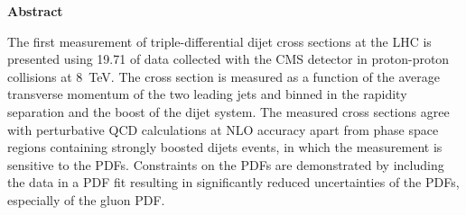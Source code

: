 \thispagestyle{plain}
\begin{center}
    \LARGE{\textbf{Abstract}}\\[2em]
\end{center}
    \normalsize
    The first measurement of triple-differential dijet cross sections at the LHC is presented
    using \SI{19.71}{\fbinv} of data collected with the CMS detector in
    proton-proton collisions at \SI{8}{\TeV}. The cross section is measured as a
    function of the average transverse momentum of the two leading jets and
    binned in the rapidity separation and the boost of the dijet system. The
    measured cross sections agree with perturbative QCD calculations at NLO
    accuracy apart from phase space regions containing strongly boosted dijets
    events, in which the measurement is sensitive to the PDFs. Constraints
    on the PDFs are demonstrated by including the data in a PDF fit resulting in
    significantly reduced uncertainties of the PDFs, especially of the gluon PDF.
    \vspace{1ex}


\cleardoublepage

